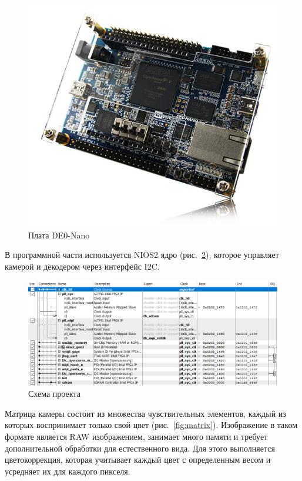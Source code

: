 \documentclass[a4paper,14pt]{article}
\begin{document}
	\begin{figure}[H]
		\centering
		\includegraphics[width=0.7\linewidth]{images/de0-nano}
		\caption{Плата DE0-Nano}
		\label{fig:de0}
	\end{figure}
	
	В программной части используется NIOS2 ядро (рис.~\ref{fig:nios}), которое управляет камерой и декодером через интерфейс I2C. 
	
 	\begin{figure}[H]
		\centering
		\includegraphics[width=\linewidth]{images/nios}
		\caption{Схема проекта}
		\label{fig:nios}
	\end{figure}
	
	Матрица камеры состоит из множества чувствительных элементов, каждый из которых воспринимает только свой цвет (рис.~\ref{fig:matrix}). 
	Изображение в таком формате является RAW изображением, занимает много памяти и требует дополнительной обработки для естественного вида.
	Для этого выполняется цветокоррекция, которая учитывает каждый цвет с определенным весом и усредняет их для каждого пикселя.
	
\end{document}
